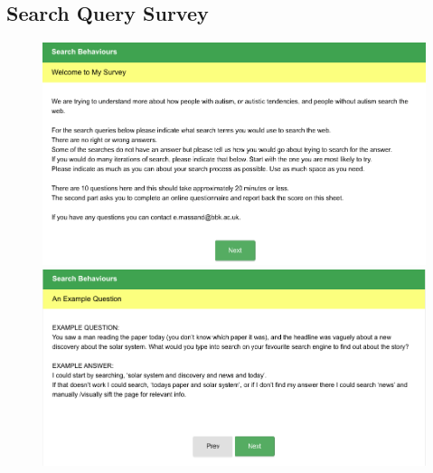 \documentclass[a4paper, 11pt]{article}
\begin{document}
\newpage
\subsection{Search Query Survey} \label{AppendixA}

\begin{figure}[H]
\begin{center}
\includegraphics[scale=0.5]{survey1}\\
\includegraphics[scale=0.5]{survey2}\\
\end{center}
\end{figure}
\newpage
\end{document}
